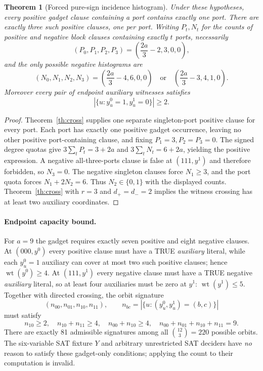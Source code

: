 \documentclass[11pt]{article}
\newtheorem{theorem}{Theorem}
\begin{document}
\begin{theorem}[Forced pure-sign incidence histogram]\label{th:quota}
Under these hypotheses, every positive gadget clause containing a port contains \emph{exactly one} port. There are exactly three such positive clauses, one per port. Writing $P_t,N_t$ for the counts of positive and negative block clauses containing exactly $t$ ports, necessarily
\[
(P_0,P_1,P_2,P_3)=\left(\frac{2a}{3}-2,3,0,0\right),
\]
and the only possible negative histograms are
\[
(N_0,N_1,N_2,N_3)=
\left(\frac{2a}{3}-4,6,0,0\right)
\quad\text{or}\quad
\left(\frac{2a}{3}-3,4,1,0\right).
\]
Moreover every pair of endpoint auxiliary witnesses satisfies
\[
|\{u:y^0_u=1,y^1_u=0\}|\ge2.
\]
\end{theorem}

\begin{proof}
Theorem~\ref{th:cross} supplies one separate singleton-port positive clause for every port. Each port has exactly one positive gadget occurrence, leaving no other positive port-containing clause, and fixing $P_1=3,P_2=P_3=0$. The signed degree quotas give $3\sum_tP_t=3+2a$ and $3\sum_tN_t=6+2a$, yielding the positive expression. A negative all-three-ports clause is false at $(111,y^1)$ and therefore forbidden, so $N_3=0$. The negative singleton clauses force $N_1\ge3$, and the port quota forces $N_1+2N_2=6$. Thus $N_2\in\{0,1\}$ with the displayed counts. Theorem~\ref{th:cross} with $r=3$ and $d_+=d_-=2$ implies the witness crossing has at least two auxiliary coordinates.
\end{proof}

\paragraph{Endpoint capacity bound.}
For $a=9$ the gadget requires exactly seven positive and eight negative clauses. At $(000,y^0)$ every positive clause must have a TRUE \emph{auxiliary} literal, while each $y^0_u=1$ auxiliary can cover at most two such positive clauses; hence $\operatorname{wt}(y^0)\ge4$. At $(111,y^1)$ every negative clause must have a TRUE negative \emph{auxiliary} literal, so at least four auxiliaries must be zero at $y^1$: $\operatorname{wt}(y^1)\le5$. Together with directed crossing, the orbit signature
\[
(n_{00},n_{01},n_{10},n_{11}),\qquad
 n_{bc}=|\{u:(y^0_u,y^1_u)=(b,c)\}|
\]
must satisfy
\[
\boxed{
n_{10}\ge2,\quad n_{10}+n_{11}\ge4,\quad n_{00}+n_{10}\ge4,\quad
n_{00}+n_{01}+n_{10}+n_{11}=9.
}
\]
There are exactly 81 admissible signatures among all $\binom{12}{3}=220$ possible orbits. The six-variable SAT fixture $Y$ and arbitrary unrestricted SAT deciders have \emph{no} reason to satisfy these gadget-only conditions; applying the count to their computation is invalid.
\end{document}
